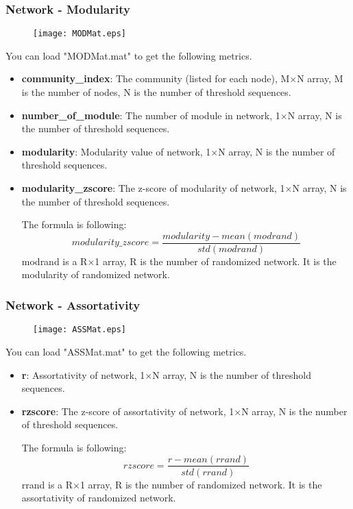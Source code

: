 \documentclass[11pt]{article}
\begin{document}
			\subsubsection{Network - Modularity}
				\begin{figure}
					\begin{center}
						\texttt{[image: MODMat.eps]}
					\end{center}
				\end{figure}
				You can load "MODMat.mat" to get the following metrics.
				\begin{itemize}
					\item \textbf{community\_index}: The community (listed for each node),
						M$\times$N array, M is the number of nodes, N is the number of threshold sequences.
					\item \textbf{number\_of\_module}: The number of module in network,
						1$\times$N array, N is the number of threshold sequences.
					\item \textbf{modularity}: Modularity value of network,
						1$\times$N array, N is the number of threshold sequences.
					\item \textbf{modularity\_zscore}: The z-score of modularity of network,
						1$\times$N array, N is the number of threshold sequences.

						The formula is following:
						$$modularity\_zscore=\frac{modularity-mean(modrand)}{std(modrand)}$$
						modrand is a R$\times$1 array, R is the number of randomized network. 
						It is the modularity of randomized network.
				\end{itemize}
			\subsubsection{Network - Assortativity}
				\begin{figure}
					\begin{center}
						\texttt{[image: ASSMat.eps]}
					\end{center}
				\end{figure}
				You can load "ASSMat.mat" to get the following metrics.
				\begin{itemize}
					\item \textbf{r}: Assortativity of network,
						1$\times$N array, N is the number of threshold sequences.
					\item \textbf{rzscore}: The z-score of assortativity of network,
						1$\times$N array, N is the number of threshold sequences.

						The formula is following:
						$$rzscore=\frac{r-mean(rrand)}{std(rrand)}$$
						rrand is a R$\times$1 array, R is the number of randomized network. 
						It is the assortativity of randomized network.
				\end{itemize}
\end{document}
